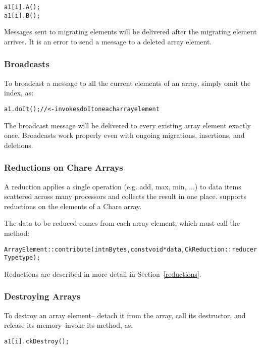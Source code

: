 \begin{alltt}
a1[i].A();
a1[i].B();
\end{alltt}

Messages sent to migrating elements will be delivered after
the migrating element arrives.  It is an error to send 
a message to a deleted array element.


\subsubsection{Broadcasts}
To  broadcast a message to all the current elements of an array, 
simply omit the index, as:

\begin{alltt}
a1.doIt(); //<- invokes doIt on each array element
\end{alltt}

The broadcast message will be delivered to every existing array 
element exactly once.  Broadcasts work properly even with ongoing
migrations, insertions, and deletions.


\subsubsection{Reductions on Chare Arrays}
A reduction applies a single operation (e.g. add,
max, min, ...) to data items scattered across many processors and
collects the result in one place.  \charmpp{} supports reductions on the
elements of a Chare array.

The data to be reduced comes from each array element, 
which must call the  method:

\begin{alltt}
ArrayElement::contribute(int nBytes,const void *data,CkReduction::reducerType type);
\end{alltt}

Reductions are described in more detail in Section~\ref{reductions}.


\subsubsection{Destroying Arrays}
To destroy an array element-- detach it from the array,
call its destructor, and release its memory--invoke its 
 method, as:

\begin{alltt}
a1[i].ckDestroy();
\end{alltt}

